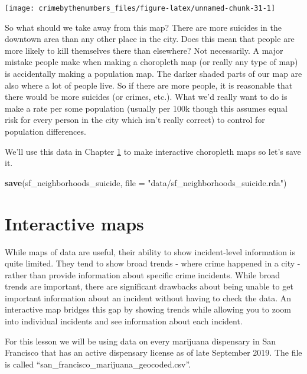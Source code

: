 \documentclass[
  12pt,
]{book}
\newenvironment{Shaded}{\begin{snugshade}}{\end{snugshade}}
\newcommand{\DataTypeTok}[1]{\textcolor[rgb]{0.27,0.27,0.27}{#1}}
\newcommand{\KeywordTok}[1]{\textcolor[rgb]{0.27,0.27,0.27}{\textbf{#1}}}
\newcommand{\NormalTok}[1]{#1}
\newcommand{\StringTok}[1]{\textcolor[rgb]{0.5,0.5,0.5}{#1}}
\begin{document}
\begin{center}\texttt{[image: crimebythenumbers\_files/figure-latex/unnamed-chunk-31-1]} \end{center}

So what should we take away from this map? There are more suicides in the downtown area than any other place in the city. Does this mean that people are more likely to kill themselves there than elsewhere? Not necessarily. A major mistake people make when making a choropleth map (or really any type of map) is accidentally making a population map. The darker shaded parts of our map are also where a lot of people live. So if there are more people, it is reasonable that there would be more suicides (or crimes, etc.). What we'd really want to do is make a rate per some population (usually per 100k though this assumes equal risk for every person in the city which isn't really correct) to control for population differences.

We'll use this data in Chapter \ref{interactive-maps} to make interactive choropleth maps so let's save it.

\begin{Shaded}
\begin{Highlighting}[]
\KeywordTok{save}\NormalTok{(sf\_neighborhoods\_suicide, }\DataTypeTok{file =} \StringTok{"data/sf\_neighborhoods\_suicide.rda"}\NormalTok{)}
\end{Highlighting}
\end{Shaded}

\hypertarget{interactive-maps}{%
\chapter{Interactive maps}\label{interactive-maps}}

While maps of data are useful, their ability to show incident-level information is quite limited. They tend to show broad trends - where crime happened in a city - rather than provide information about specific crime incidents. While broad trends are important, there are significant drawbacks about being unable to get important information about an incident without having to check the data. An interactive map bridges this gap by showing trends while allowing you to zoom into individual incidents and see information about each incident.

For this lesson we will be using data on every marijuana dispensary in San Francisco that has an active dispensary license as of late September 2019. The file is called ``san\_francisco\_marijuana\_geocoded.csv''.
\end{document}
